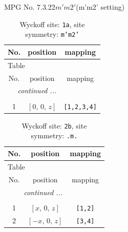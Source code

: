 \documentclass[fleqn,8pt]{jsarticle}
\begin{document}
\setcounter{MaxMatrixCols}{32}

\renewcommand{\tablename}{Table~}
\renewcommand{\figurename}{Figure~}
\begin{center}
\LARGE
MPG No. 7.3.22\quad$m'm2'$\quad(m'm2' setting)
\end{center}
\renewcommand{\arraystretch}{1.2}
\begin{longtable}{ccc}
\caption{Wyckoff site: {\tt 1a}, site symmetry: {\tt m'm2'}}
 \\
 \hline \hline
No. & position & mapping \\ \hline \endfirsthead

\multicolumn{2}{l}{\tablename\ \thetable{}} \\
 \hline \hline
No. & position & mapping \\ \hline \endhead

 \hline \hline
\multicolumn{2}{r}{\footnotesize\it continued ...} \\ \endfoot

 \hline \hline
\multicolumn{2}{r}{} \\ \endlastfoot

1 & $\left[ 0,\, 0,\, z \right]$ & {\tt [1,2,3,4]} \\
\end{longtable}
\renewcommand{\arraystretch}{1.2}
\begin{longtable}{ccc}
\caption{Wyckoff site: {\tt 2b}, site symmetry: {\tt .m.}}
 \\
 \hline \hline
No. & position & mapping \\ \hline \endfirsthead

\multicolumn{2}{l}{\tablename\ \thetable{}} \\
 \hline \hline
No. & position & mapping \\ \hline \endhead

 \hline \hline
\multicolumn{2}{r}{\footnotesize\it continued ...} \\ \endfoot

 \hline \hline
\multicolumn{2}{r}{} \\ \endlastfoot

1 & $\left[ x,\, 0,\, z \right]$ & {\tt [1,2]} \\ \hline
2 & $\left[ - x,\, 0,\, z \right]$ & {\tt [3,4]} \\
\end{longtable}
\renewcommand{\arraystretch}{1.2}
\end{document}
